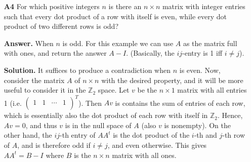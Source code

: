 \documentclass[11pt,a4paper]{article}
\newcommand{\bbZ}{\mathbb Z}
\newcommand{\<}{\langle}
\renewcommand{\>}{\rangle}
\begin{document}
\begin{enumerate}
	\item[\textbf{A4}] For which positive integers $n$ is there an $n\times n$ matrix with integer entries such that every dot product of a row with itself is even, while every dot product of two different rows is odd?
	
	\textbf{Answer.} When $n$ is odd. For this example we can use $A$ as the matrix full with ones, and return the answer $A-I$. (Basically, the $ij$-entry is 1 iff $i\neq j$). 
	
	\textbf{Solution.} It suffices to produce a contradiction when $n$ is even. Now, consider the matrix $A$ of $n\times n$ with the desired property, and it will be more useful to consider it in the $\bbZ_2$ space. Let $v$ be the $n\times 1$ matrix with all entries 1 (i.e. $\begin{pmatrix}1 & 1 & \cdots & 1\\ \end{pmatrix}^T$). Then $Av$ is contains the sum of entries of each row, which is essentially also the dot product of each row with itself in $\bbZ_2$. Hence, $Av=0$, and thus $v$ is in the null space of $A$ (also $v$ is nonempty). On the other hand, the $ij$-th entry of $AA^t$ is the dot product of the $i$-th and $j$-th row of $A$, and is therefore odd if $i\neq j$, and even otherwise. This gives $AA^t=B-I$ where $B$ is the $n\times n$ matrix with all ones. 
	

\end{enumerate}
\end{document}
